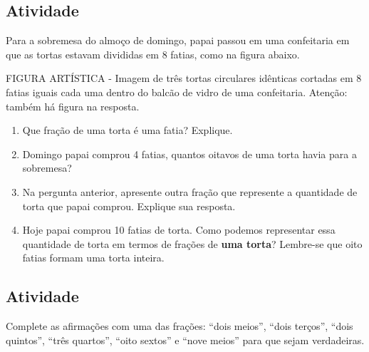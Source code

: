 \documentclass[a4,12pt]{book}
\begin{document}
\subsection{Atividade}

Para a sobremesa do almoço de domingo, papai passou em uma confeitaria em que as tortas estavam divididas em 8 fatias, como na figura abaixo. 

\begin{imagem*}[breakable]{}{}   FIGURA ARTÍSTICA - Imagem de três tortas circulares idênticas cortadas em 8 fatias iguais cada uma dentro do balcão de vidro de uma confeitaria. Atenção: também há figura na resposta.  
\end{imagem*}

\begin{enumerate} [\quad a)] %
  \item     Que fração de uma torta é uma fatia? Explique.
  \item     Domingo papai comprou 4 fatias, quantos oitavos de uma torta havia para a sobremesa?
  \item     Na pergunta anterior, apresente outra fração que represente a quantidade de torta que papai comprou. Explique sua resposta.
  \item     Hoje papai comprou 10 fatias de torta. Como podemos representar essa quantidade de torta em termos de frações de {\bf uma torta}? Lembre-se que oito fatias formam uma torta inteira.
\end{enumerate} %

\subsection{Atividade}

Complete as afirmações com uma das frações: ``dois meios'', ``dois terços'', ``dois quintos'', ``três quartos'', ``oito sextos'' e ``nove meios'' para que sejam verdadeiras.
\end{document}

